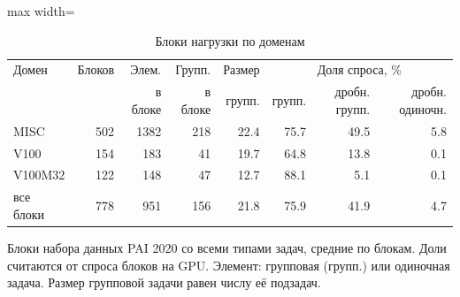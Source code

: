 \begin{table}[htbp]
\centering
\small
\caption{Блоки нагрузки по доменам}
\label{tab:blocks}
\begin{adjustbox}{max width=\textwidth}
\begin{tabular}{lrrrrrrr}
\toprule
Домен & Блоков & Элем. & Групп. & Размер & \multicolumn{3}{c}{Доля спроса, \%} \\
 & & в блоке & в блоке & групп. & групп. & дробн. групп. & дробн. одиночн. \\
\midrule
MISC & 502 & 1382 & 218 & 22.4 & 75.7 & 49.5 & 5.8 \\
V100 & 154 & 183 & 41 & 19.7 & 64.8 & 13.8 & 0.1 \\
V100M32 & 122 & 148 & 47 & 12.7 & 88.1 & 5.1 & 0.1 \\
\midrule
все блоки & 778 & 951 & 156 & 21.8 & 75.9 & 41.9 & 4.7 \\
\bottomrule
\end{tabular}
\end{adjustbox}
\par\smallskip
\parbox{0.95\textwidth}{\footnotesize Блоки набора данных PAI 2020 со всеми типами задач, средние по блокам. Доли считаются от спроса блоков на GPU. Элемент: групповая (групп.) или одиночная задача. Размер групповой задачи равен числу её подзадач.}
\end{table}
